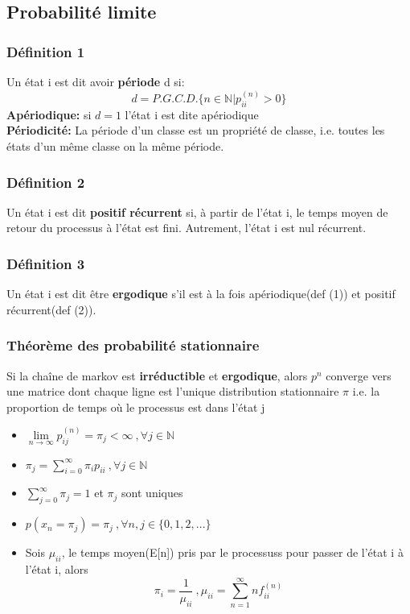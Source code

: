 \documentclass[13pt]{article}
\begin{document}
\subsection*{Probabilité limite}

\subsubsection*{Définition 1}
Un état i est dit avoir \textbf{période} d si:
\[ d = P.G.C.D.\{ n \in \mathbb{N}|p_{ii}^{(n)} > 0 \} \]
\textbf{Apériodique:} si $d=1$ l'état i est dite apériodique\\
\textbf{Périodicité:} La période d'un classe est un propriété de classe, i.e. toutes les états d'un même classe on la même période.

\subsubsection*{Définition 2}
Un état i est dit \textbf{positif récurrent} si, à partir de l'état i, le temps moyen de retour 
du processus à l'état  est fini. Autrement, l'état i est nul récurrent.

\subsubsection*{Définition 3}
Un état i est dit être \textbf{ergodique} s’il est à la fois apériodique(def (1)) et positif récurrent(def (2)).

\subsubsection*{Théorème des probabilité stationnaire}
Si la chaîne de markov est \textbf{irréductible} et \textbf{ergodique}, alors $p^n$ converge vers une matrice dont chaque ligne est l'unique distribution stationnaire $\pi$
i.e. la proportion de temps où le processus est dans l'état j
\begin{itemize}
  \item $\lim\limits_{n \to \infty} p_{ij}^{(n)} = \pi_j < \infty \:,\forall j \in \mathbb{N}$ 
  \item $\pi_j = \sum\limits_{i=0}^\infty \pi_i p_{ii} \:,\forall j \in \mathbb{N}$
  \item $\sum\limits_{j=0}^\infty \pi_j = 1$ et $\pi_j$ sont uniques
  \item $p(x_{n} = \pi_j) = \pi_j \:, \forall n,j \in \{0,1,2,... \}$
  \item Sois $\mu_{ii}$, le temps moyen(E[n]) pris par le processuss pour passer de l'état i à l'état i, alors
  \[ \pi_i = \frac{1}{\mu_{ii}} \:,\mu_{ii} = \sum_{n=1}^\infty n f_{ii}^{(n)} \]
\end{itemize}
\end{document}

